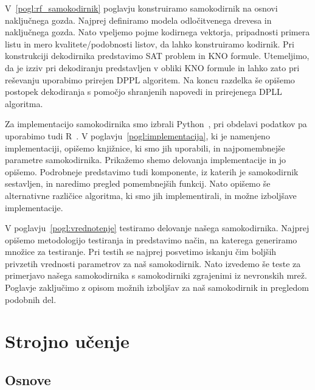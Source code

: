 \documentclass[12pt,a4paper,twoside]{article}
\theoremstyle{definition} %
\theoremstyle{plain} %
\numberwithin{equation}{section}  %
\begin{document}
V~\ref{pogl:rf_samokodirnik} poglavju konstruiramo samokodirnik na osnovi naključnega gozda.
Najprej definiramo modela odločitvenega drevesa in naključnega gozda.
Nato vpeljemo pojme kodirnega vektorja, pripadnosti primera listu in mero kvalitete/\-podobnosti listov, da lahko konstruiramo kodirnik.
Pri konstrukciji dekodirnika predstavimo SAT problem in KNO formule. 
Utemeljimo, da je izziv pri dekodiranju predstavljen v obliki KNO formule in lahko zato pri reševanju uporabimo prirejen DPPL algoritem.
Na koncu razdelka še opišemo postopek dekodiranja s pomočjo shranjenih napovedi in prirejenega DPLL algoritma.

Za implementacijo samokodirnika smo izbrali Python~\cite{python}, pri obdelavi podatkov pa uporabimo tudi R~\cite{r}.
V poglavju~\ref{pogl:implementacija}, ki je namenjeno implementaciji, opišemo knjižnice, ki smo jih uporabili, in najpomembnejše parametre samokodirnika.
Prikažemo shemo delovanja implementacije in jo opišemo.
Podrobneje predstavimo tudi komponente, iz katerih je samokodirnik sestavljen, in naredimo pregled pomembnejših funkcij.
Nato opišemo še alternativne različice algoritma, ki smo jih implementirali, in možne izboljšave implementacije.

V poglavju~\ref{pogl:vrednotenje} testiramo delovanje našega samokodirnika.
Najprej opišemo metodologijo testiranja in predstavimo način, na katerega generiramo množice za testiranje.
Pri testih se najprej posvetimo iskanju čim boljših privzetih vrednosti parametrov za naš samokodirnik.
Nato izvedemo še teste za primerjavo našega samokodirnika s samokodirniki zgrajenimi iz nevronskih mrež.
Poglavje zaključimo z opisom možnih izboljšav za naš samokodirnik in pregledom podobnih del.


\section{Strojno učenje}
\label{pogl:strojno_ucenje}

\subsection{Osnove}
\end{document}
